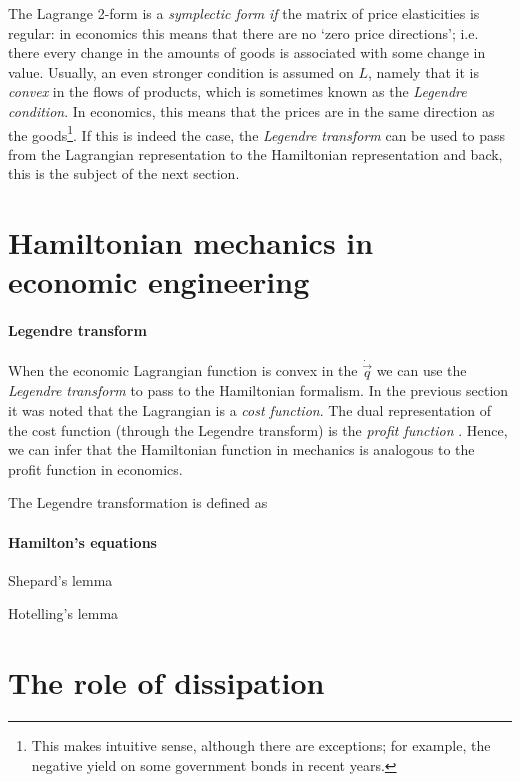 The Lagrange 2-form is a \emph{symplectic form} \emph{if} the matrix of price elasticities is regular: in economics this means that there are no `zero price directions'; i.e. there every change in the amounts of goods is associated with some change in value. Usually, an even stronger condition is assumed on $L$, namely that it is \emph{convex} in the flows of products, which is sometimes known as the \emph{Legendre condition}. In economics, this means that the prices are in the same direction as the goods\footnote{This makes intuitive sense, although there are exceptions; for example, the negative yield on some government bonds in recent years.}. If this is indeed the case, the \emph{Legendre transform} can be used to pass from the Lagrangian representation to the Hamiltonian representation and back, this is the subject of the next section. 

\section{Hamiltonian mechanics in economic engineering}
\paragraph{Legendre transform} 
When the economic Lagrangian function is convex in the $\dot{\vec{q}}$ we can use the \emph{Legendre transform} to pass to the Hamiltonian formalism. In the previous section it was noted that the Lagrangian is a \emph{cost function}. The dual representation of the cost function (through the Legendre transform) is the \emph{profit function} \cite{blume2020,varianhalr1992}. Hence, we can infer that the Hamiltonian function in mechanics is analogous to the profit function in economics. 

The Legendre transformation is defined as

\paragraph{Hamilton's equations}
Shepard's lemma

Hotelling's lemma

\section{The role of dissipation}


